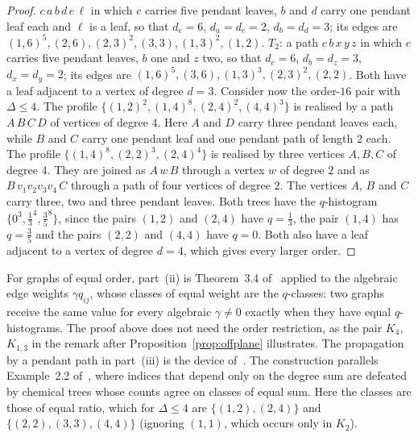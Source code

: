 \documentclass[a5paper, 10pt]{article}
\theoremstyle{plain}
\theoremstyle{remark}
\theoremstyle{definition}
\begin{document}
\begin{proof}
  $c\,a\,b\,d\,e\,\ell$ in which $c$ carries five pendant leaves, $b$ and
  $d$ carry one pendant leaf each and $\ell$ is a leaf, so that
  $d_c = 6$, $d_a = d_e = 2$, $d_b = d_d = 3$; its edges are
  $(1,6)^{5}, (2,6), (2,3)^{2}, (3,3), (1,3)^{2}, (1,2)$. $T_2$: a path
  $c\,b\,x\,y\,z$ in which $c$ carries five pendant leaves, $b$ one and
  $z$ two, so that $d_c = 6$, $d_b = d_z = 3$, $d_x = d_y = 2$; its
  edges are $(1,6)^{5}, (3,6), (1,3)^{3}, (2,3)^{2}, (2,2)$. Both have a
  leaf adjacent to a vertex of degree $d = 3$. Consider now the order-$16$ pair with $\Delta \le 4$. The profile
  $\{(1,2)^{2}, (1,4)^{8}, (2,4)^{2}, (4,4)^{3}\}$ is realised by a path
  $A\,B\,C\,D$ of vertices of degree $4$. Here $A$ and $D$ carry three
  pendant leaves each, while $B$ and $C$ carry one pendant leaf and one
  pendant path of length $2$ each. The profile $\{(1,4)^{8}, (2,2)^{3}, (2,4)^{4}\}$ is realised by
  three vertices $A, B, C$ of degree $4$. They are joined as $A\,w\,B$
  through a vertex $w$ of degree $2$ and as $B\,v_1 v_2 v_3 v_4\,C$
  through a path of four
  vertices of degree $2$. The vertices $A$, $B$ and $C$ carry three, two
  and three pendant leaves. Both trees have the
  $q$-histogram $\{0^{3}, \tfrac13^{4}, \tfrac35^{8}\}$, since the pairs
  $(1,2)$ and $(2,4)$ have $q = \tfrac13$, the pair $(1,4)$ has
  $q = \tfrac35$ and the pairs $(2,2)$ and $(4,4)$ have $q = 0$. Both also
  have a leaf adjacent to a vertex of degree $d = 4$, which gives every
  larger order.
  \end{proof}

  For graphs of equal order, part~(ii) is Theorem~3.4 of~\cite{Rada2019ExpVDB} applied to the algebraic edge weights $\gamma q_{ij}$, whose classes of equal weight are the $q$-classes: two graphs receive the same value for every algebraic $\gamma \neq 0$ exactly when they have equal $q$-histograms. The proof above does not need the order restriction, as the pair $K_4$, $K_{1,3}$ in the remark after Proposition~\ref{prop:offplane} illustrates. The propagation by a pendant path in part~(iii) is the device of~\cite{Rada2026LinearVDB}. The construction parallels Example~2.2 of~\cite{RadaRodriguezSigarreta2022Weak}, where indices that depend only on the degree sum are defeated by chemical trees whose counts agree on classes of equal sum. Here the classes are those of equal ratio, which for $\Delta \le 4$ are $\{(1,2),(2,4)\}$ and $\{(2,2),(3,3),(4,4)\}$ (ignoring $(1,1)$, which occurs only in $K_2$).
\end{document}
